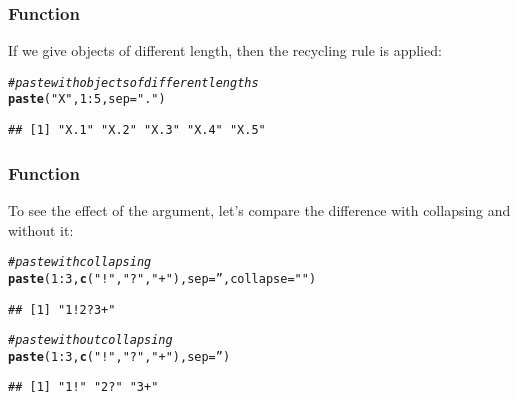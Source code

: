 \documentclass[12pt]{beamer}\usepackage[]{graphicx}\usepackage[]{color}
\makeatletter
\newcommand{\hlnum}[1]{\textcolor[rgb]{0.686,0.059,0.569}{#1}}%
\newcommand{\hlstr}[1]{\textcolor[rgb]{0.192,0.494,0.8}{#1}}%
\newcommand{\hlcom}[1]{\textcolor[rgb]{0.678,0.584,0.686}{\textit{#1}}}%
\newcommand{\hlopt}[1]{\textcolor[rgb]{0,0,0}{#1}}%
\newcommand{\hlstd}[1]{\textcolor[rgb]{0.345,0.345,0.345}{#1}}%
\newcommand{\hlkwc}[1]{\textcolor[rgb]{0.333,0.667,0.333}{#1}}%
\newcommand{\hlkwd}[1]{\textcolor[rgb]{0.737,0.353,0.396}{\textbf{#1}}}%
\newenvironment{kframe}{%
 \def\at@end@of@kframe{}%
 \ifinner\ifhmode%
  \def\at@end@of@kframe{\end{minipage}}%
  \begin{minipage}{\columnwidth}%
 \fi\fi%
 \def\FrameCommand##1{\hskip\@totalleftmargin \hskip-\fboxsep
 \colorbox{shadecolor}{##1}\hskip-\fboxsep
     \hskip-\linewidth \hskip-\@totalleftmargin \hskip\columnwidth}%
 \MakeFramed {\advance\hsize-\width
   \@totalleftmargin\z@ \linewidth\hsize
   \@setminipage}}%
 {\par\unskip\endMakeFramed%
 \at@end@of@kframe}
\newenvironment{knitrout}{}{} %
\makeatother
\begin{document}
\begin{frame}[fragile]
\frametitle{Function }

If we give  objects of different length, then the recycling rule is applied:
\begin{knitrout}\footnotesize
{}\color{fgcolor}\begin{kframe}
\begin{alltt}
\hlcom{# paste with objects of different lengths}
\hlkwd{paste}\hlstd{(}\hlstr{"X"}\hlstd{,} \hlnum{1}\hlopt{:}\hlnum{5}\hlstd{,} \hlkwc{sep} \hlstd{=} \hlstr{"."}\hlstd{)}
\end{alltt}
\begin{verbatim}
## [1] "X.1" "X.2" "X.3" "X.4" "X.5"
\end{verbatim}
\end{kframe}
\end{knitrout}

\end{frame}


\begin{frame}[fragile]
\frametitle{Function }

To see the effect of the  argument, let's compare the difference with collapsing and without it:
\begin{knitrout}\footnotesize
{}\color{fgcolor}\begin{kframe}
\begin{alltt}
\hlcom{# paste with collapsing}
\hlkwd{paste}\hlstd{(}\hlnum{1}\hlopt{:}\hlnum{3}\hlstd{,} \hlkwd{c}\hlstd{(}\hlstr{"!"}\hlstd{,} \hlstr{"?"}\hlstd{,} \hlstr{"+"}\hlstd{),} \hlkwc{sep} \hlstd{=} \hlstr{''}\hlstd{,} \hlkwc{collapse} \hlstd{=} \hlstr{""}\hlstd{)}
\end{alltt}
\begin{verbatim}
## [1] "1!2?3+"
\end{verbatim}
\begin{alltt}
\hlcom{# paste without collapsing}
\hlkwd{paste}\hlstd{(}\hlnum{1}\hlopt{:}\hlnum{3}\hlstd{,} \hlkwd{c}\hlstd{(}\hlstr{"!"}\hlstd{,} \hlstr{"?"}\hlstd{,} \hlstr{"+"}\hlstd{),} \hlkwc{sep} \hlstd{=} \hlstr{''}\hlstd{)}
\end{alltt}
\begin{verbatim}
## [1] "1!" "2?" "3+"
\end{verbatim}
\end{kframe}
\end{knitrout}

\end{frame}
\end{document}
